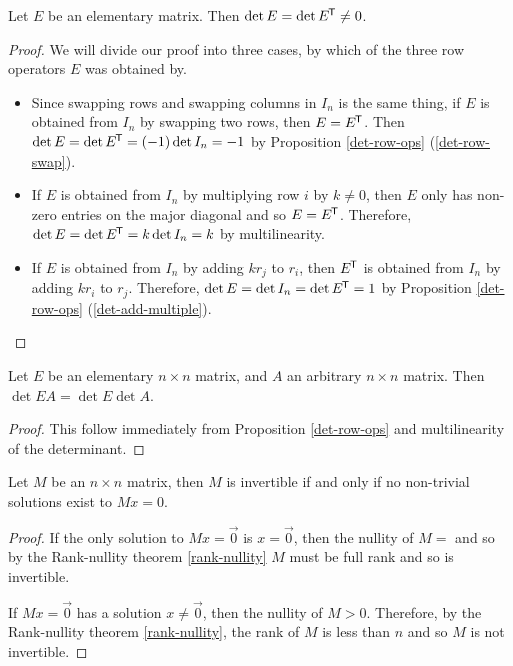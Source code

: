 \begin{lemma}\label{elementary-transpose-determinant}
    Let $E$ be an elementary matrix. Then $\det E = \det{E}^{\mkern-1.5mu\mathsf{T}} \neq 0$.
\end{lemma}

\begin{proof}
    We will divide our proof into three cases, by which of the three row operators $E$ was obtained by.

    \begin{itemize}
        \item Since swapping rows and swapping columns in $I_n$ is the same thing, if $E$ is obtained from $I_n$ by swapping two rows, then $E = {E}^{\mkern-1.5mu\mathsf{T}}$. Then $\det E = \det{E}^{\mkern-1.5mu\mathsf{T}} = (-1)\det I_n = -1$ by Proposition \ref{det-row-ops} (\ref{det-row-swap}).
        \item If $E$ is obtained from $I_n$ by multiplying row $i$ by $k \neq 0$, then $E$ only has non-zero entries on the major diagonal and so $E = {E}^{\mkern-1.5mu\mathsf{T}}$. Therefore, $\det E = \det{E}^{\mkern-1.5mu\mathsf{T}} = k \det I_n = k$ by multilinearity.
        \item If $E$ is obtained from $I_n$ by adding $kr_j$ to $r_i$, then ${E}^{\mkern-1.5mu\mathsf{T}}$ is obtained from $I_n$ by adding $kr_i$ to $r_j$. Therefore, $\det E = \det I_n = \det{E}^{\mkern-1.5mu\mathsf{T}} = 1$ by Proposition \ref{det-row-ops} (\ref{det-add-multiple}).
    \end{itemize}
\end{proof}

\begin{lemma}\label{determinant-respects-elementary-product}
    Let $E$ be an elementary $n \times n$ matrix, and $A$ an arbitrary $n \times n$ matrix. Then $\det EA = \det E \det A$.
\end{lemma}

\begin{proof}
    This follow immediately from Proposition \ref{det-row-ops} and multilinearity of the determinant.
\end{proof}

\begin{lemma}\label{invertible-matrix-solutions}
    Let $M$ be an $n \times n$ matrix, then $M$ is invertible if and only if no non-trivial solutions exist to $Mx = 0$.
\end{lemma}

\begin{proof}
    If the only solution to $Mx = \vec{0}$ is $x = \vec{0}$, then the nullity of $M = $ and so by the Rank-nullity theorem \ref{rank-nullity} $M$ must be full rank and so is invertible.

    If $Mx = \vec{0}$ has a solution $x \neq \vec{0}$, then the nullity of $M > 0$. Therefore, by the Rank-nullity theorem \ref{rank-nullity}, the rank of $M$ is less than $n$ and so $M$ is not invertible.
\end{proof}

